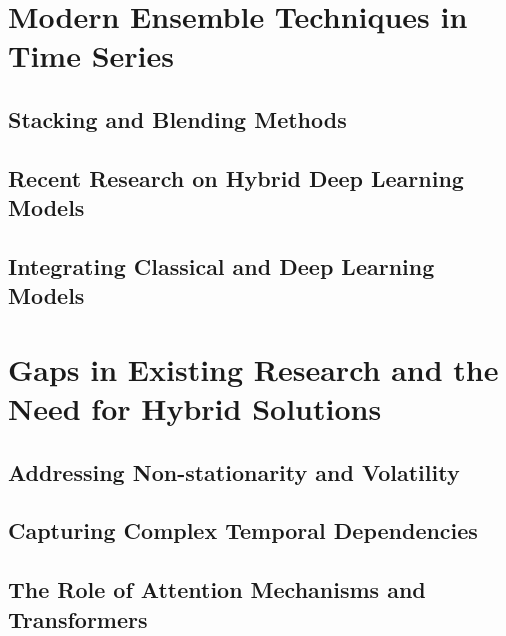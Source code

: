 \section{Modern Ensemble Techniques in Time Series} %

\subsection{Stacking and Blending Methods} %

\subsection{Recent Research on Hybrid Deep Learning Models} %

\subsection{Integrating Classical and Deep Learning Models} %

\section{Gaps in Existing Research and the Need for Hybrid Solutions} %
\subsection{Addressing Non-stationarity and Volatility} %

\subsection{Capturing Complex Temporal Dependencies} %

\subsection{The Role of Attention Mechanisms and Transformers} %
